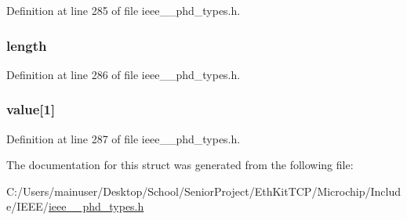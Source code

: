 Definition at line 285 of file ieee\+\_\+\_\+phd\+\_\+types.\+h.

\hypertarget{struct___attr_val_map_a3743679e4ff85e3e1b3fc2e59973fbb3}{}
\subsubsection[{length}]{ length}\label{struct___attr_val_map_a3743679e4ff85e3e1b3fc2e59973fbb3}


Definition at line 286 of file ieee\+\_\+\_\+phd\+\_\+types.\+h.

\hypertarget{struct___attr_val_map_ae441aff11c5753866353206b99d69a28}{}
\subsubsection[{value}]{ value\mbox{[}1\mbox{]}}\label{struct___attr_val_map_ae441aff11c5753866353206b99d69a28}


Definition at line 287 of file ieee\+\_\+\_\+phd\+\_\+types.\+h.



The documentation for this struct was generated from the following file\+:\begin{DoxyCompactItemize}
\item 
C\+:/\+Users/mainuser/\+Desktop/\+School/\+Senior\+Project/\+Eth\+Kit\+T\+C\+P/\+Microchip/\+Include/\+I\+E\+E\+E/\hyperlink{ieee__11073__phd__types_8h}{ieee\+\_\+\_\+phd\+\_\+types.\+h}\end{DoxyCompactItemize}
